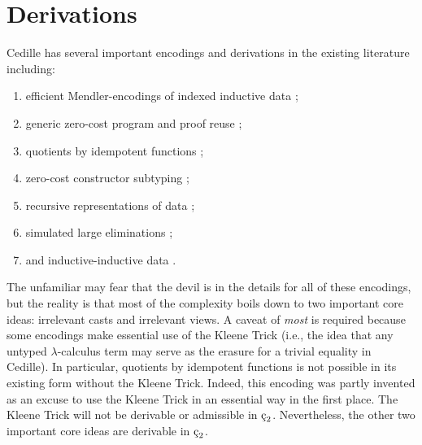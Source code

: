 \section{Derivations}

Cedille has several important encodings and derivations in the existing literature including:
\begin{enumerate}
    \item efficient Mendler-encodings of indexed inductive data \cite{firsov2018_mendler};
    \item generic zero-cost program and proof reuse \cite{diehl2018_generic_reuse};
    \item quotients by idempotent functions \cite{marmaduke2020quotients};
    \item zero-cost constructor subtyping \cite{marmaduke2020_constructor_subtyping};
    \item recursive representations of data \cite{jenkins2021monotone};
    \item simulated large eliminations \cite{jenkins2021_large_elim};
    \item and inductive-inductive data \cite{marmaduke2023_indind}.
\end{enumerate}
The unfamiliar may fear that the devil is in the details for all of these encodings, but the reality is that most of the complexity boils down to two important core ideas: irrelevant casts and irrelevant views.
A caveat of \textit{most} is required because some encodings make essential use of the Kleene Trick (i.e., the idea that any untyped $\lambda$-calculus term may serve as the erasure for a trivial equality in Cedille).
In particular, quotients by idempotent functions is not possible in its existing form without the Kleene Trick.
Indeed, this encoding was partly invented as an excuse to use the Kleene Trick in an essential way in the first place.
The Kleene Trick will not be derivable or admissible in $\ced$.
Nevertheless, the other two important core ideas are derivable in $\ced$.

